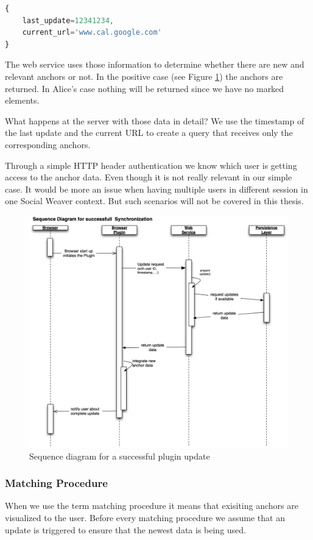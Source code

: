 
\begin{lstlisting}[language=JavaScript]
{
	last_update=12341234,
	current_url='www.cal.google.com'
}
\end{lstlisting}

The web service uses those information to determine whether there are new and relevant anchors or not. In the positive case (see Figure \ref{sequence-update}) the anchors are returned. In Alice's case nothing will be returned since we have no marked elements. 

What happens at the server with those data in detail? We use the timestamp of the last update and the current URL to create a query that receives only the corresponding anchors. 

Through a simple HTTP header authentication we know which user is getting access to the anchor data. Even though it is not really relevant in our simple case. It would be more an issue when having multiple users in different session in one Social Weaver context. But such scenarios will not be covered in this thesis.

\begin{figure}[h!] \centering
		\includegraphics[width=13cm]{images/sequence-update.png}
		\caption{Sequence diagram for a successful plugin update}
		\label{sequence-update}
\end{figure} 

\subsubsection*{Matching Procedure}
When we use the term matching procedure it means that exisiting anchors are visualized to the user. Before every matching procedure we assume that an update is triggered to ensure that the newest data is being used. 

